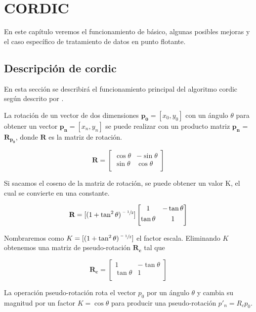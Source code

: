 \chapter{CORDIC}

En este capítulo veremos el funcionamiento de  básico, algunas posibles mejoras y el caso específico de tratamiento de datos en punto flotante.

\section{Descripción de \gls{cordic}}

En esta sección se describirá el funcionamiento principal del algoritmo \gls{cordic} según descrito por \cite{volder_cordic_1959}.

La rotación de un vector de dos dimensiones $\boldsymbol{p_{0}} = [x_{0},y_{0}]$ con un ángulo $\theta$ para obtener un vector $\boldsymbol{p_{n}} = [x_{n},y_{n}]$ se puede realizar con un producto matriz $\boldsymbol{p_{n}}$ = $\boldsymbol{R_{p_{0}}}$, donde $\textbf{R}$ es la matriz de rotación.

\[ \textbf{R} = \begin{bmatrix}
\cos{\theta} & -\sin{\theta} 	\\[0.3em]
\sin{\theta}  & \cos{\theta} 			\\[0.3em]
\end{bmatrix} \]

Si sacamos el coseno de la matriz de rotación, se puede obtener un valor K, el cual se convierte en una constante.

\[ \textbf{R} = [(1 + \tan^2{\theta})^{\sfrac{-1}{2}}] \begin{bmatrix}
1 & -\tan{\theta} 	\\[0.3em]
\tan{\theta}  & 1 			\\[0.3em]
\end{bmatrix} \]

Nombraremos como $K = [(1 + \tan^2{\theta})^{\sfrac{-1}{2}}]$ el factor escala. Eliminando $K$ obtenemos una matriz de pseudo-rotación $\boldsymbol{R_{c}}$ tal que

\[ \boldsymbol{R_{c}} = \begin{bmatrix}
1 & -\tan{\theta} 	\\[0.3em]
\tan{\theta}  & 1 			\\[0.3em]
\end{bmatrix} \]

La operación pseudo-rotación rota el vector $p_{0}$ por un ángulo $\theta$ y cambia su magnitud por un factor $K = \cos{\theta}$ para producir una pseudo-rotación $p'_n = R_c p_0$.

